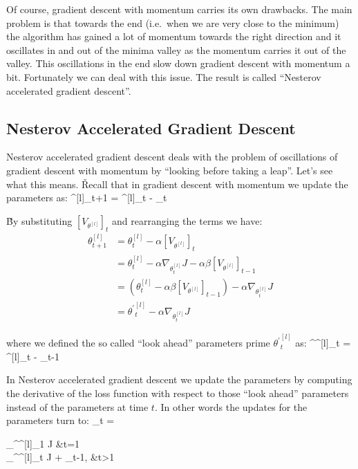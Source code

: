 Of course, gradient descent with momentum carries its own drawbacks. The main problem is that towards the end (i.e.\
when we are very close to the minimum) the algorithm has gained a lot of momentum towards the right direction and it
oscillates in and out of the minima valley as the momentum carries it out of the valley. This oscillations in the end
slow down gradient descent with momentum a bit. Fortunately we can deal with this issue. The result is called
``Nesterov accelerated gradient descent''.

\subsection{Nesterov Accelerated Gradient Descent}

Nesterov accelerated gradient descent deals with the problem of oscillations of gradient descent with momentum by
``looking before taking a leap''. Let's see what this means. \v

Recall that in gradient descent with momentum we update the parameters as:
\bse
\theta^{[l]}_{t+1} = \theta^{[l]}_t - \alpha [V_{\theta^{[l]}}]_t
\ese

\v

By substituting $[V_{\theta^{[l]}}]_t $ and rearranging the terms we have:
\begin{align*}
 \theta^{[l]}_{t+1} &= \theta^{[l]}_t - \alpha [V_{\theta^{[l]}}]_t \\ &= \theta^{[l]}_t - \alpha
 \nabla_{\theta^{[l]}_t} J - \alpha \beta [V_{\theta^{[l]}}]_{t-1} \\ &= ( \theta^{[l]}_t - \alpha \beta
 [V_{\theta^{[l]}}]_{t-1}) - \alpha \nabla_{\theta^{[l]}_t} J \\ &= {\theta^{\prime}}^{[l]}_{t} - \alpha
 \nabla_{\theta^{[l]}_t} J
\end{align*}

where we defined the so called ``look ahead'' parameters prime ${\theta^{\prime}}^{[l]}_{t} $ as:
\bse
{\theta^{\prime}}^{[l]}_{t} = \theta^{[l]}_t - \alpha \beta [V_{\theta^{[l]}}]_{t-1}
\ese

In Nesterov accelerated gradient descent we update the parameters by computing the derivative of the loss function
with respect to those ``look ahead'' parameters instead of the parameters at time $t$. In other words the updates for
the parameters turn to:
\bse
[V_{\theta^{[l]}}]_t =
\begin{cases}
\nabla_{{\theta^{\prime}}^{[l]}_{1}} J &t=1\\
\nabla_{{\theta^{\prime}}^{[l]}_{t}} J + \beta [V_{\theta^{[l]}}]_{t-1}, &t>1
\end{cases}
\ese

